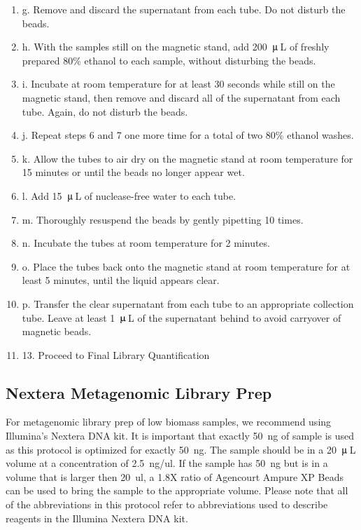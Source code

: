 \documentclass[graybox]{svmult}
\begin{document}
\begin{enumerate}
\item{g.      Remove and discard the supernatant from each tube. Do not disturb the beads.}
\item{h.      With the samples still on the magnetic stand, add 200~$\umu$\,L of freshly prepared 80\% ethanol to each sample, without disturbing the beads.}
\item{i.      Incubate at room temperature for at least 30 seconds while still on the magnetic stand, then remove and discard all of the supernatant from each tube. Again, do not disturb the beads.}
\item{j.      Repeat steps 6 and 7 one more time for a total of two 80\% ethanol washes.}
\item{k.      Allow the tubes to air dry on the magnetic stand at room temperature for 15 minutes or until the beads no longer appear wet.}
\item{l.      Add 15~$\umu$\,L of nuclease-free water to each tube.}
\item{m.      Thoroughly resuspend the beads by gently pipetting 10 times.}
\item{n.      Incubate the tubes at room temperature for 2 minutes.}
\item{o.      Place the tubes back onto the magnetic stand at room temperature for at least 5 minutes, until the liquid appears clear.}
\item{p.      Transfer the clear supernatant from each tube to an appropriate collection tube. Leave at least 1~$\umu$\,L of the supernatant behind to avoid carryover of magnetic beads.}
\item{13.     Proceed to Final Library Quantification}
\end{enumerate}

\subsection{Nextera Metagenomic Library Prep}

For metagenomic library prep of low biomass samples, we recommend using Illumina’s Nextera DNA kit. It is important that exactly 50~ng of sample is used as this protocol is optimized for exactly 50~ng. The sample should be in a 20~$\umu$\,L volume at a concentration of 2.5~ng/ul. If the sample has 50~ng but is in a volume that is larger then 20~ul, a 1.8X ratio of Agencourt Ampure XP Beads can be used to bring the sample to the appropriate volume.  Please note that all of the abbreviations in this protocol refer to abbreviations used to describe reagents in the Illumina Nextera DNA kit.
\end{document}
